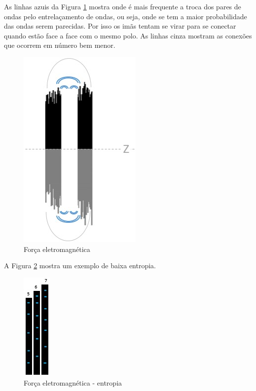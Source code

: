 As linhas azuis da Figura \ref{fig:consciousness_electromaagnetic_force} mostra onde é mais frequente a troca dos pares de ondas pelo entrelaçamento de ondas, ou seja, onde se tem a maior probabilidade das ondas serem parecidas. Por isso os imãs tentam se virar para se conectar quando estão face a face com o mesmo polo. As linhas cinza mostram as conexões que ocorrem em número bem menor. 
	\begin{figure}[H]
	\caption{Força eletromagnética}
	\label{fig:consciousness_electromaagnetic_force}
	\centering
	\includegraphics[scale=.7]{sections/images/consciousness_electromaagnetic_force.jpg}
	\end{figure}

A Figura \ref{fig:consciousness_electromaagnetic_force_entropy} mostra um exemplo de baixa entropia. 
	\begin{figure}[H]
	\caption{Força eletromagnética - entropia}
	\label{fig:consciousness_electromaagnetic_force_entropy}
	\centering
	\includegraphics[scale=.9]{sections/images/consciousness_electromaagnetic_force_entropy.jpg}
	\end{figure}


